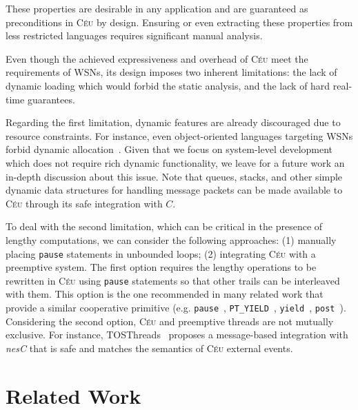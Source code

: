 \documentclass[letterpaper]{sig-alternate}
\newcommand{\code}[1] {{\small{\texttt{#1}}}}
\newcommand{\CEU}{\textsc{C\'{e}u}\xspace}
\begin{document}
These properties are desirable in any application and are guaranteed as 
preconditions in \CEU by design.
Ensuring or even extracting these properties from less restricted languages 
requires significant manual analysis.

Even though the achieved expressiveness and overhead of \CEU meet the 
requirements of WSNs, its design imposes two inherent limitations:
the lack of dynamic loading which would forbid the static analysis,
and the lack of hard real-time guarantees.

Regarding the first limitation, dynamic features are already discouraged due to 
resource constraints.
For instance, even object-oriented languages targeting WSNs forbid dynamic 
allocation~\cite{wsn.flowtalk,wsn.virgil}.
%
Given that we focus on system-level development which does not require rich 
dynamic functionality, we leave for a future work an in-depth discussion about 
this issue.
Note that queues, stacks, and other simple dynamic data structures for handling 
message packets can be made available to \CEU through its safe integration with 
$C$.

To deal with the second limitation, which can be critical in the presence of 
lengthy computations, we can consider the following approaches:
(1) manually placing \code{pause} statements in unbounded loops;
(2) integrating \CEU with a preemptive system.
%
The first option requires the lengthy operations to be rewritten in \CEU using
\code{pause} statements so that other trails can be interleaved with them.
This option is the one recommended in many related work that provide a similar 
cooperative primitive (e.g. \code{pause}~\cite{esterel.primer}, 
\code{PT\_YIELD}~\cite{wsn.protothreads}, \code{yield}~\cite{wsn.sol}, 
\code{post}~\cite{wsn.nesc}).
%
Considering the second option, \CEU and preemptive threads are not mutually 
exclusive.
For instance, TOSThreads~\cite{wsn.tosthreads} proposes a message-based 
integration with \emph{nesC} that is safe and matches the semantics of \CEU 
external events.

\section{Related Work}
\label{sec.related}
\end{document}
